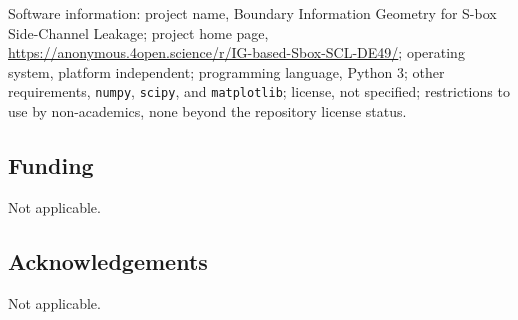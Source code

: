 \documentclass[referee,lineno,pdflatex,sn-mathphys-num]{sn-jnl}
\theoremstyle{thmstylethree}
\theoremstyle{thmstyletwo}
\theoremstyle{thmstyleone}
\begin{document}
Software information: project name, Boundary Information Geometry for S-box
Side-Channel Leakage; project home page,
\url{https://anonymous.4open.science/r/IG-based-Sbox-SCL-DE49/};
operating system, platform independent; programming language, Python 3; other
requirements, \texttt{numpy}, \texttt{scipy}, and \texttt{matplotlib};
license, not specified; restrictions to use by non-academics, none beyond the
repository license status.

\subsection*{Funding}

Not applicable.

\subsection*{Acknowledgements}

Not applicable.


\end{document}
